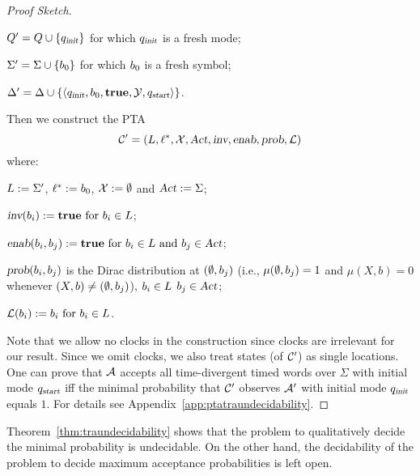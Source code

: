 \begin{proof}[Proof Sketch]
\begin{compactitem}
\item $Q'   = Q  \cup \{ q_{\mbox{\sl\scriptsize init} } \}$ for which $q_{\mbox{\sl\scriptsize init} }$ is a fresh mode;
\item $\Sigma'  = \Sigma \cup \{ b_{0} \}$ for which $b_{0}$ is a fresh symbol;
\item $\Delta'     = \Delta    \cup \{ \langle
            q_{\mbox{\sl\scriptsize init} },
            b_{0},
            \mathbf{true},
            \mathcal{Y},
            q_{\mbox{\sl\scriptsize start}}
        \rangle
    \}$.
\end{compactitem}
Then we construct the PTA
\[
\mathcal{C}'=\left(L, \ell^*, \mathcal{X}, \mbox{\sl Act}, \mbox{\sl inv}, \mbox{\sl enab},  \mbox{\sl prob}, \mathcal{L}\right)
\]
where:
\begin{compactitem}
    \item $L      :=  \Sigma'$, $\ell^*     :=  b_{0} $, $\mathcal{X}    :=  \emptyset $ and $\mbox{\sl Act}      :=  \Sigma $;
    \item $\mbox{\sl inv}(b_{i})              :=  \mathbf{true}
                                            \text{ for }
                                            b_{i} \in L$;
    \item $\mbox{\sl enab}(b_{i},b_{j})   :=  \mathbf{true}
                                            \text{ for }
                                            b_{i} \in L
                                            \text{ and }
                                            b_{j} \in \mbox{\sl Act}$;
    \item $\mbox{\sl prob}(b_{i},b_{j})$ is the Dirac distribution at $(\emptyset,b_{j})$ (i.e., $\mu(\emptyset,b_{j})=1$ and $\mu(X,b)=0$ whenever $(X,b)\ne(\emptyset,b_{j})$),
                                            $b_{i} \in L$
                                            $b_{j} \in \mbox{\sl Act}$;
    \item $\mathcal{L}(b_{i})           :=  b_{i}
                                            \text{ for } b_{i} \in L$.
\end{compactitem}
Note that we allow no clocks in the construction since clocks are irrelevant for our result.
Since we omit clocks, we also treat states (of $\mathcal{C}'$) as single locations.
One can prove that $\mathcal{A}$ accepts all time-divergent timed words over $\Sigma$ with initial mode $q_{\mbox{\sl\scriptsize start}}$ iff
the minimal probability that $\mathcal{C}'$ observes $\mathcal{A}'$ with initial mode $q_{\mbox{\sl\scriptsize init} }$ equals $1$.
For details see Appendix~\ref{app:ptatraundecidability}. 
\end{proof}

\begin{remark}
Theorem~\ref{thm:traundecidability} shows that the problem to qualitatively decide the minimal probability is undecidable. 
On the other hand, the decidability of the problem to decide maximum acceptance probabilities is left open.
\end{remark}
